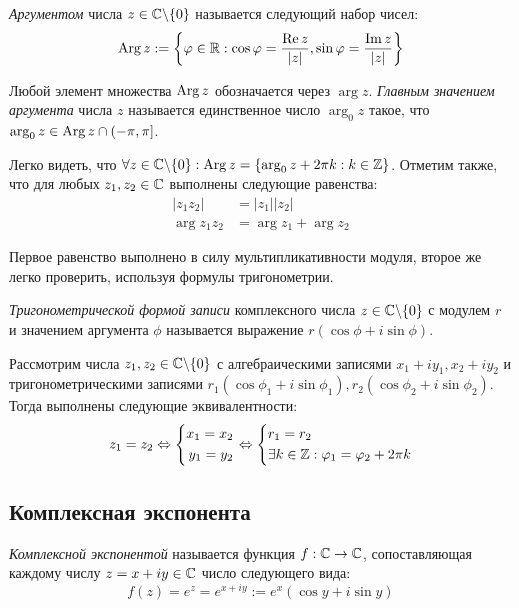 \begin{definition}
	\textit{Аргументом} числа $z \in \mathbb{C} \backslash \{0\}$ называется следующий набор чисел:
	\[\operatorname{Arg}{z} := \left\{\varphi \in \mathbb{R}: \cos\varphi = \frac{\operatorname{Re} z}{|z|}, \sin\varphi = \frac{\operatorname{Im} z}{|z|}\right\}\]
	
	Любой элемент множества $\operatorname{Arg}{z}$ обозначается через $\arg{z}$. \textit{Главным значением аргумента} числа $z$ называется единственное число $\arg_0{z}$ такое, что $\arg_0{z} \in \operatorname{Arg}{z} \cap (-\pi, \pi]$.
\end{definition}

\begin{note}
	Легко видеть, что $\forall z \in \mathbb{C} \backslash \{0\}: \operatorname{Arg}{z} = \{\arg_0{z} + 2\pi k: k \in \mathbb{Z}\}$. Отметим также, что для любых $z_1, z_2 \in \mathbb{C}$ выполнены следующие равенства:
	\begin{align*}
		|z_1z_2| &= |z_1||z_2|\\
		\arg{z_1z_2} &= \arg{z_1} + \arg{z_2}
	\end{align*}
	
	Первое равенство выполнено в силу мультипликативности модуля, второе же легко проверить, используя формулы тригонометрии.
\end{note}

\begin{definition}
	\textit{Тригонометрической формой записи} комплексного числа $z \in \mathbb{C} \backslash \{0\}$ с модулем $r$ и значением аргумента $\phi$ называется выражение $r(\cos\phi + i\sin\phi)$.
\end{definition}

\begin{note}
	Рассмотрим числа $z_1, z_2 \in \mathbb{C} \backslash \{0\}$ с алгебраическими записями $x_1 + iy_1, x_2 + iy_2$ и тригонометрическими записями $r_1(\cos\phi_1 + i\sin\phi_1), r_2(\cos\phi_2 + i\sin\phi_2)$. Тогда выполнены следующие эквивалентности:
	\[z_1 = z_2 \Leftrightarrow \left\{\begin{aligned}x_1 = x_2 \\ y_1 = y_2\end{aligned}\right. \Leftrightarrow \left\{\begin{aligned}&r_1 = r_2 \\ &\exists k \in \mathbb{Z}: \varphi_1 = \varphi_2 + 2\pi k\end{aligned}\right.\]
\end{note}

\subsection{Комплексная экспонента}

\begin{definition}
	\textit{Комплексной экспонентой} называется функция $f : \mathbb{C} \to \mathbb{C}$, сопоставляющая каждому числу $z = x + iy \in \mathbb{C}$ число следующего вида:
	\[f(z) = e^z = e^{x + iy} := e^x(\cos{y} + i\sin{y})\]
\end{definition}

